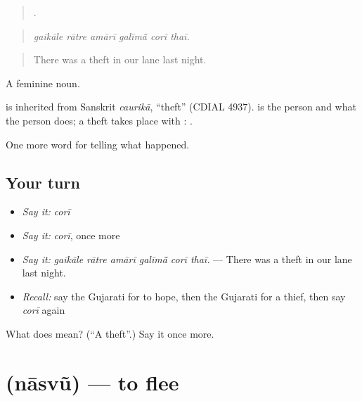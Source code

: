 \begin{quote}
     .
\end{quote}

\begin{quote}
\emph{gaīkāle rātre amārī galīmā̃ corī thaī.}
\end{quote}

\begin{quote}
There was a theft in our lane last night.
\end{quote}

A feminine noun.

\begin{cousinweb}
is inherited from Sanskrit \emph{caurikā}, \textquotedblleft{}theft\textquotedblright{} (CDIAL 4937). \textbf{} is the person and \textbf{} what the person does; a theft takes place with \textbf{}: \textbf{ }.
\end{cousinweb}

\begin{grammarlens}[title={What you've built}]
One more word for telling what happened.
\end{grammarlens}

\subsection*{Your turn}
\begin{itemize}
\raggedright
  \item \emph{Say it:} \emph{corī}
  \item \emph{Say it:} \emph{corī}, once more
  \item \emph{Say it:} \emph{gaīkāle rātre amārī galīmā̃ corī thaī.} — There was a theft in our lane last night.
  \item \emph{Recall:} say the Gujarati for to hope, then the Gujarati for a thief, then say \emph{corī} again
\end{itemize}

\begin{tcolorbox}[breakable,colback=teal!4,colframe=teal!35!black,title={Before you move on}]
What does  mean? (\textquotedblleft{}A theft\textquotedblright{}.) Say it once more.
\end{tcolorbox}
\section[\texorpdfstring{\gu{નાસવું} (nāsvũ)}{નાસવું (nāsvũ)}]{ (nāsvũ) — to flee}


